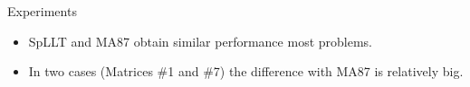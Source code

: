 \documentclass{beamer}
\newcommand{\dr}[1]{\textcolor{mred}{#1\xspace}}
\newcommand{\dd}[1]{\textcolor{gray!70}{#1\xspace}}
\begin{document}
\begin{frame}{Experiments}
\begin{center}
  \end{center}
  
  \begin{itemize}
  \item SpLLT and MA87 obtain similar performance most problems.
  \item In two cases (Matrices \#1 and \#7) the difference with MA87
    is relatively big.
  \end{itemize}
\end{frame}
\end{document}
